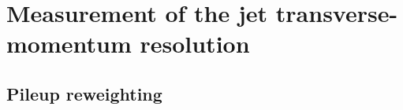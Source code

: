 \FloatBarrier
\chapter{\texorpdfstring{Measurement of the jet transverse-momentum resolution}{Appendix: \quad Measurement of the jet transverse-momentum resolution}}
\section{Pileup reweighting}
\label{res:app:pileup}

